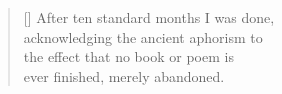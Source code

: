 \thispagestyle{empty}




\pagebreak
\hspace{0pt}
\vfill


\settowidth{\versewidth}{the effect that no book or poem is}
\begin{verse}[\versewidth]
After ten standard months I was done,\\
acknowledging the ancient aphorism to\\
the effect that no book or poem is\\
ever finished, merely abandoned.
\end{verse}


\vfill
\hspace{0pt}
\pagebreak





\cleardoublepage

